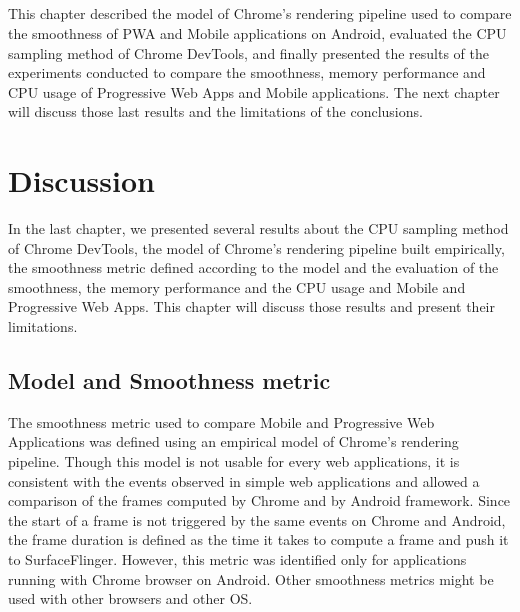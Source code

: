 \documentclass{kththesis}
\begin{document}
\paragraph{}
This chapter described the model of Chrome's rendering pipeline used to compare the smoothness of PWA and Mobile applications on Android, evaluated the CPU sampling method of Chrome DevTools, and finally presented the results of the experiments conducted to compare the smoothness, memory performance and CPU usage of Progressive Web Apps and Mobile applications. The next chapter will discuss those last results and the limitations of the conclusions.


\chapter{Discussion}

In the last chapter, we presented several results about the CPU sampling method of Chrome DevTools, the model of Chrome's rendering pipeline built empirically, the smoothness metric defined according to the model and the evaluation of the smoothness, the memory performance and the CPU usage and Mobile and Progressive Web Apps. This chapter will discuss those results and present their limitations.


\section{Model and Smoothness metric}
The smoothness metric used to compare Mobile and Progressive Web Applications was defined using an empirical model of Chrome's rendering pipeline. Though this model is not usable for every web applications, it is consistent with the events observed in simple web applications and allowed a comparison of the frames computed by Chrome and by Android framework. Since the start of a frame is not triggered by the same events on Chrome and Android, the frame duration is defined as the time it takes to compute a frame and push it to SurfaceFlinger. However, this metric was identified only for applications running with Chrome browser on Android. Other smoothness metrics might be used with other browsers and other OS. 
\end{document}
